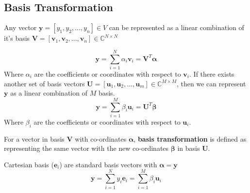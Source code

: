 

\begin{appendices}

\chapter{}
\section{Basis Transformation}
Any vector $\textbf{y} = [y_{1}, y_{2},...,y_{n}] \in V$ can be represented as a \gls{linear combination} of it's \gls{basis} $\textbf{V} = [\textbf{v}_{1}, \textbf{v}_{2},...,\textbf{v}_{n}] \in \mathbb{C}^{N \times N}$
  
\[
\textbf{y} = \displaystyle\sum_{i=1}^{N}\alpha_{i}\textbf{v}_{i} = \textbf{V}^{T}\bm{\alpha}
\]
Where $\alpha_{i}$ are the coefficients or coordinates with respect to $\textbf{v}_{i}$. If there exists another set of \gls{basis} vectors $\textbf{U} = [\textbf{u}_{1}, \textbf{u}_{2},...,\textbf{u}_{m}] \in \mathbb{C}^{M \times M}$, then we can represent $\textbf{y}$ as a \gls{linear combination} of $M$ \gls{basis}.
\[
\textbf{y} = \displaystyle\sum_{i=1}^{M}\beta_{i}\textbf{u}_{i} = \textbf{U}^{T}\bm{\beta}
\]
Where $\beta_{i}$ are the coefficients or coordinates with respect to $\textbf{u}_{i}$.
\bigskip

\noindent For a vector in basis $\textbf{V}$ with co-ordinates $\bm{\alpha}$, \textbf{basis transformation} is defined as representing the same vector with the new co-ordinates $\bm{\beta}$ in basis $\textbf{U}$.
\bigskip

\noindent Cartesian basis ($\textbf{e}_{i}$) are standard basis vectors with $\bm{\alpha} = \textbf{y}$
\[
\textbf{y} = \displaystyle\sum_{i=1}^{N}y_{i}\textbf{e}_{i} = \displaystyle\sum_{i=1}^{M}\beta_{i}\textbf{u}_{i}
\]

\end{appendices}